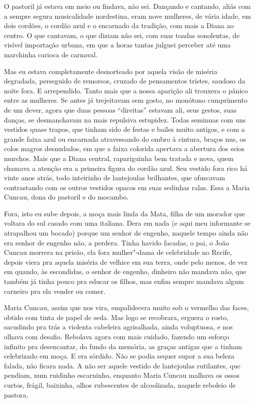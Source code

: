 O pastoril já estava em meio ou findava, não sei. Dançando e cantando,
aliás com a sempre segura musicalidade nordestina, eram nove mulheres,
de vária idade, em dois cordões, o cordão azul e o encarnado da
tradição, com mais a Diana ao centro. O que cantavam, o que diziam não
sei, com suas toadas sonolentas, de visível importação urbana, em que a
horas tantas julguei perceber até uma marchinha carioca de carnaval.

Mas eu estava completamente desnorteado por aquela visão de miséria
degradada, perseguido de remorsos, cruzado de pensamentos tristes,
saudoso da noite fora. E arrependido. Tanto mais que a nossa aparição
ali trouxera o pânico entre as mulheres. Se antes já trejeitavam sem
gosto, no monótono cumprimento de um dever, agora que duas pessoas
``direitas'' estavam ali, seus gestos, suas danças, se desmanchavam na
mais repulsiva estupidez. Todas seminuas com uns vestidos quase trapos,
que tinham sido de festas e bailes muito antigos, e com a grande faixa
azul ou encarnada atravessando do ombro à cintura, braços nus, os colos
magros desnudados, em que a faixa colorida apertava a abertura dos seios
murchos. Mais que a Diana central, rapariguinha bem tratada e nova, quem
chamava a atenção era a primeira figura do cordão azul. Seu vestido fora
rico há vinte anos atrás, todo inteirinho de lantejoulas brilhantes, que
ofuscavam contrastando com os outros vestidos opacos em suas sedinhas
ralas. Essa a Maria Cuncau, dona do pastoril e do mocambo.

Fora, isto eu sube depois, a moça mais linda da Mata, filha de um
morador que voltara do sul casado com uma italiana. Dera em nada (e aqui
meu informante se atrapalhou um bocado) porque um senhor de engenho,
naquele tempo ainda não era senhor de engenho não, a perdera. Tinha
havido facadas, o pai, o João Cuncau morrera na prisão, ela fora
mulher"-dama de celebridade no Recife, depois viera pra aquela miséria de
velhice em sua terra, onde pelo menos, de vez em quando, às escondidas,
o senhor de engenho, dinheiro não mandava não, que também já tinha pouco
pra educar os filhos, mas enfim sempre mandava algum carneiro pra ela
vender ou comer.

Maria Cuncau, assim que nos vira, empalidecera muito sob o vermelho das
faces, obtido com tinta de papel de seda. Mas logo se recobrara, erguera
o rosto, sacudindo pra trás a violenta cabeleira agrisalhada, ainda
voluptuosa, e nos olhava com desafio. Rebolava agora com mais cuidado,
fazendo um esforço infinito pra desencantar, do fundo da memória, as
graças antigas que a tinham celebrizado em moça. E era sórdido. Não se
podia sequer supor a sua beleza falada, não ficara nada. A não ser
aquele vestido de lantejoulas rutilantes, que pendiam, num ruidinho
escarninho, enquanto Maria Cuncau malhava os ossos curtos, frágil,
baixinha, olhos rubescentes de alcoolizada, naquele reboleio de pastora.

